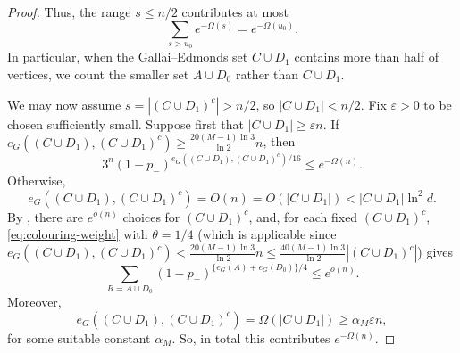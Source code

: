 \documentclass[notitlepage]{scrartcl}
\begin{document}
\begin{proof}
Thus, the range $s \leq n/2$ contributes at most
\begin{equation}\label{eq:small-side-sum}
 \sum_{s>u_0}e^{-\Omega(s)}=e^{-\Omega(u_0)}.
\end{equation}
In particular, when the Gallai--Edmonds set $C \cup D_1$ contains more than half of vertices, we count the smaller set $A\cup D_0$ rather than $C \cup D_1$.

We may now assume $s=|(C \cup D_1)^c|>n/2$, so $|C \cup D_1|<n/2$.
Fix $\varepsilon>0$ to be chosen sufficiently small. Suppose first that $|C \cup D_1|\ge\varepsilon n$.
If $e_G((C \cup D_1), (C \cup D_1)^c)\ge \frac{20(M-1) \ln 3}{\ln 2}n$, then
\[
 3^n (1-p_-)^{e_G((C \cup D_1), (C \cup D_1)^c)/16}\le e^{-\Omega(n)}.
\]
Otherwise,
\[
 e_G((C \cup D_1), (C \cup D_1)^c)=O(n)=O(|C \cup D_1|)< |C \cup D_1|\ln^2 d.
\]
By , there are $e^{o(n)}$ choices for $(C \cup D_1)^c$, and, for each fixed $(C \cup D_1)^c$, \eqref{eq:colouring-weight} with $\theta=1/4$ (which is applicable since $e_G((C \cup D_1), (C \cup D_1)^c)<\frac{20(M-1) \ln 3}{\ln 2}n\le\frac{40(M-1) \ln 3}{\ln 2}|(C \cup D_1)^c|$) gives
\[
 \sum_{R=A\sqcup D_0}
 (1-p_-)^{\{e_G(A)+e_G(D_0)\}/4}\le e^{o(n)}.
\]
Moreover,
\[
 e_G((C \cup D_1), (C \cup D_1)^c)=\Omega(|C \cup D_1|)\ge \alpha_M\varepsilon n,
\]
for some suitable constant $\alpha_M$.
So, in total this contributes $e^{-\Omega(n)}$.


\end{proof}
\end{document}
